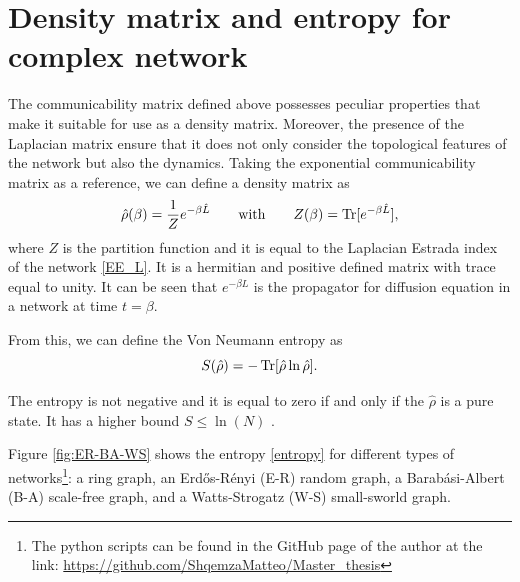 \section{Density matrix and entropy for complex network}
The communicability matrix defined above possesses peculiar properties that make it suitable for use as a density matrix. Moreover, the presence of the Laplacian matrix ensure that it does not only consider the topological features of the network but also the dynamics. Taking the exponential communicability matrix as a reference, we can define a density matrix as
\begin{equation}\label{density_matrix}
    \hat \rho(\beta) = \frac{1}{Z} e^{-\beta \hat L} \qquad \mathrm{with} \qquad Z(\beta) = \operatorname{Tr}[e^{-\beta \hat L}],
\end{equation}
where $Z$ is the partition function and it is equal to the Laplacian Estrada index of the network \eqref{EE_L}.
It is a hermitian and positive defined matrix with trace equal to unity. 
It can be seen that $e^{-\beta L}$ is the propagator for diffusion equation in a network at time $t = \beta$.

From this, we can define the Von Neumann entropy as
\begin{equation} \label{entropy}
    S(\hat\rho) = -\operatorname{Tr}[\hat \rho \ln \hat \rho].
\end{equation}


The entropy is not negative and it is equal to zero if and only if the $\hat\rho$ is a pure state. It has a higher bound $S \leq \ln(N)$ \cite{Nielsen_Chuang_2010}.


Figure \ref{fig:ER-BA-WS} shows the entropy \eqref{entropy} for different types of networks\footnote{The python scripts can be found in the GitHub page of the author at the link: \url{https://github.com/ShqemzaMatteo/Master_thesis}}: a ring graph, an Erd\H{o}s-Rényi (E-R) random graph, a Barab\'asi-Albert (B-A) scale-free graph, and a Watts-Strogatz (W-S) small-sworld graph.

